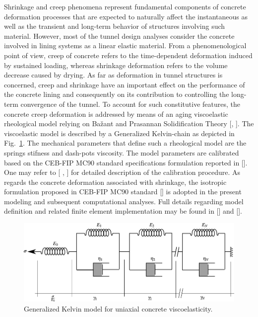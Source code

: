 \documentclass[a4paper,fleqn]{cas-sc}
\begin{document}
Shrinkage and creep phenomena represent fundamental components of concrete deformation processes that are expected to naturally affect the instantaneous as well as the transient and long-term behavior of structures involving such material. However, most of the tunnel design analyses consider the concrete involved in lining systems as a linear elastic material. From a phenomenological point of view, creep of concrete refers to the time-dependent deformation induced by sustained loading, whereas shrinkage deformation refers to the volume decrease caused by drying. As far as deformation in tunnel structures is concerned, creep and shrinkage have an important effect on the performance of the concrete lining and consequently on its contribution to controlling the long-term convergence of the tunnel. To account for such constitutive features, the concrete creep deformation is addressed by means of an aging viscoelastic rheological model relying on Bažant and Prasannan Solidification Theory [,  ]. The viscoelastic model is described by a Generalized Kelvin-chain as depicted in Fig.~\ref{reological_representation_concrete}. The mechanical parameters that define such a rheological model are the springs stifness and dash-pots viscosity. The model parameters are calibrated based on the CEB-FIP MC90 standard specifications formulation reported in []. One may refer to [ , ] for detailed description of the calibration procedure. As regards the concrete deformation associated with shrinkage, the isotropic formulation proposed in CEB-FIP MC90 standard [] is adopted in the present modeling and subsequent computational analyses. Full details regarding model definition and related finite element implementation may be found in [] and [].

\begin{figure}[h!]
	\centering
	\includegraphics[scale=1]{Rheological_representation_concrete.pdf}
	\caption{Generalized Kelvin model for uniaxial concrete viscoelasticity.}
	\label{reological_representation_concrete}
\end{figure}
\end{document}
